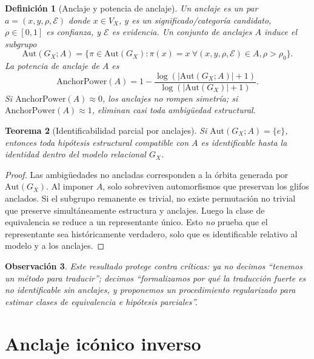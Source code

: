 \documentclass[11pt,a4paper]{article}
\newtheorem{theorem}{Teorema}[section]
\newtheorem{definition}[theorem]{Definición}
\newtheorem{remark}[theorem]{Observación}
\newcommand{\1}{\mathbf{1}}
\numberwithin{equation}{section}
\begin{document}
\begin{definition}[Anclaje y potencia de anclaje]
\label{def:anchor_power}
Un anclaje es un par $a=(x,y,\rho,\mathcal{E})$ donde $x\in V_X$, $y$ es un significado/categoría candidato, $\rho\in[0,1]$ es confianza, y $\mathcal{E}$ es evidencia. Un conjunto de anclajes $A$ induce el subgrupo
\begin{equation}
    \mathrm{Aut}(G_X;A)=\{\pi\in\mathrm{Aut}(G_X):\pi(x)=x\ \forall (x,y,\rho,\mathcal{E})\in A,\rho>\rho_0\}.
\end{equation}
La potencia de anclaje de $A$ es
\begin{equation}
    \mathrm{AnchorPower}(A)=1-\frac{\log(|\mathrm{Aut}(G_X;A)|+1)}{\log(|\mathrm{Aut}(G_X)|+1)}.
\end{equation}
Si $\mathrm{AnchorPower}(A)\approx 0$, los anclajes no rompen simetría; si $\mathrm{AnchorPower}(A)\approx 1$, eliminan casi toda ambigüedad estructural.
\end{definition}

\begin{theorem}[Identificabilidad parcial por anclajes]
\label{thm:anchor_identifiability}
Si $\mathrm{Aut}(G_X;A)=\{e\}$, entonces toda hipótesis estructural compatible con $A$ es identificable hasta la identidad dentro del modelo relacional $G_X$.
\end{theorem}

\begin{proof}
Las ambigüedades no ancladas corresponden a la órbita generada por $\mathrm{Aut}(G_X)$. Al imponer $A$, solo sobreviven automorfismos que preservan los glifos anclados. Si el subgrupo remanente es trivial, no existe permutación no trivial que preserve simultáneamente estructura y anclajes. Luego la clase de equivalencia se reduce a un representante único. Esto \emph{no} prueba que el representante sea históricamente verdadero, solo que es identificable relativo al modelo y a los anclajes.
\end{proof}

\begin{remark}
Este resultado protege contra críticas: ya no decimos ``tenemos un método para traducir''; decimos ``formalizamos por qué la traducción fuerte es no identificable sin anclajes, y proponemos un procedimiento regularizado para estimar clases de equivalencia e hipótesis parciales''.
\end{remark}

\section{Anclaje icónico inverso}
\label{sec:inverse_iconic_grounding}
\end{document}
